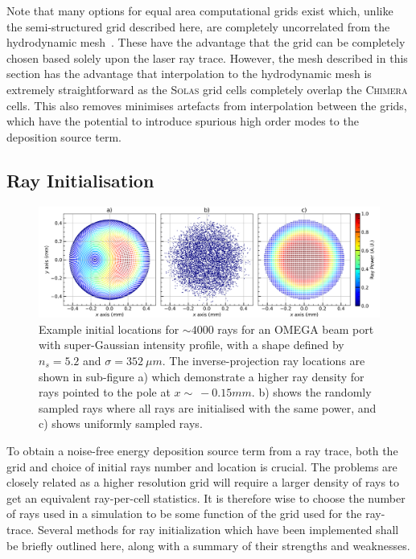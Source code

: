 Note that many options for equal area computational grids exist which, unlike the semi-structured grid described here, are completely uncorrelated from the hydrodynamic mesh~\cite{cheong_eigensolutions_2015,malkin_new_2019}.
These have the advantage that the grid can be completely chosen based solely upon the laser ray trace.
However, the mesh described in this section has the advantage that interpolation to the hydrodynamic mesh is extremely straightforward as the \textsc{Solas} grid cells completely overlap the \textsc{Chimera} cells.
This also removes minimises artefacts from interpolation between the grids, which have the potential to introduce spurious high order modes to the deposition source term.

\subsection{Ray Initialisation}%
\label{sec:SOLAS_ray_init}

\begin{figure}[t!]
    \includegraphics[width=\linewidth]{Numerics/Images/ray_init_plots.png}
    \centering
    \caption{Example initial locations for $\sim4000$ rays for an OMEGA beam port with super-Gaussian intensity profile, with a shape defined by $n_s=5.2$ and $\sigma=352\ \mu m$.
    The inverse-projection ray locations are shown in sub-figure a) which demonstrate a higher ray density for rays pointed to the pole at $x\sim\  -0.15 mm$.
    b) shows the randomly sampled rays where all rays are initialised with the same power, and c) shows uniformly sampled rays.}%
    \label{fig:SOLAS_ray_init}
\end{figure}

To obtain a noise-free energy deposition source term from a ray trace, both the grid and choice of initial rays number and location is crucial.
The problems are closely related as a higher resolution grid will require a larger density of rays to get an equivalent ray-per-cell statistics.
It is therefore wise to choose the number of rays used in a simulation to be some function of the grid used for the ray-trace.
Several methods for ray initialization which have been implemented shall be briefly outlined here, along with a summary of their strengths and weaknesses.


